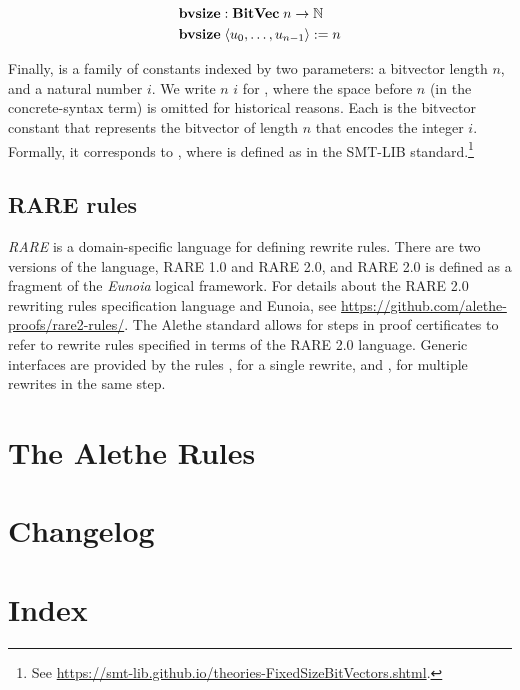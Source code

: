 \documentclass{scrartcl}
\begin{document}
\begin{align*}
\mathbf{bvsize}{}& : \mathbf{BitVec} \; n \to \mathbb{N}\\
\mathbf{bvsize}{}&\;\langle u_0, \dots, u_{n -1} \rangle := n
\end{align*}

\noindent
Finally,  is a family of constants indexed by two parameters:
a bitvector length $n$, and a natural number $i$.  We
write \inlineAlethe{(_} \cbv$n$ $i$ \inlineAlethe{)} for , where
the space before $n$ (in the concrete-syntax term) is omitted for historical reasons.
Each  is the bitvector constant that represents the bitvector
of length $n$ that encodes the integer $i$.  Formally, it corresponds
to , where  is defined
as in the SMT-LIB
standard.\footnote{See \url{https://smt-lib.github.io/theories-FixedSizeBitVectors.shtml}.}

\subsection{RARE rules}
\label{sec:alethe:rare_rules}
\emph{RARE} is a domain-specific language for defining rewrite rules.
%
There are two versions of the language, RARE 1.0 and RARE 2.0, and RARE 2.0 is
defined as a fragment of the \emph{Eunoia} logical framework.
%
For details about the RARE 2.0 rewriting rules specification language and
Eunoia, see \url{https://github.com/alethe-proofs/rare2-rules/}.
%
The Alethe standard allows for steps in proof certificates to refer to rewrite
rules specified in terms of the RARE 2.0 language. Generic interfaces are
provided by the rules , for a single rewrite, and
, for multiple rewrites in the same step.

\section{The Alethe Rules}
\label{apx:rules}


\clearpage
\section*{Changelog}
\label{sec:rules}


\clearpage
\section*{Index}
\printindex



\end{document}
